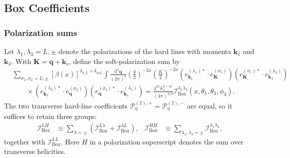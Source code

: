 \documentclass[a4paper,12pt]{article}
\def\di{{\mathrm{d}}}
\def\mb{\mathbf}
\begin{document}
\subsection{Box Coefficients}
\label{app:box-coefficients}
\subsubsection{Polarization sums}
Let $\lambda_1,\lambda_3=L,\pm$ denote the polarizations of the hard lines with momenta $\mb k_1$ and $\mb k_3$.
With $\mb K=\mb q+\mb k_s$, define the soft-polarization sum by
\begin{align}
    &\sum_{\sigma_1,\sigma_2=L,\pm}
    [\beta(x)]^{\delta_{\sigma_1L}+\delta_{\sigma_2L}}
    \int\frac{\di^3\mb q}{(2\pi)^3}
    \left(\frac q2\right)^{-2x}
    \left(\frac K2\right)^{-2x}
    (e_{\mb k_1}^{(\lambda_1)*}\!\cdot e_{\mb K}^{(\sigma_1)})
    (e_{\mb K}^{(\sigma_1)*}\!\cdot e_{\mb k_3}^{(\lambda_3)})
    \nonumber\\
    &\qquad\times
    (e_{\mb k_3}^{(\lambda_3)*}\!\cdot e_{\mb q}^{(\sigma_2)})
    (e_{\mb q}^{(\sigma_2)*}\!\cdot e_{\mb k_1}^{(\lambda_1)})
    =\frac{4^{2x}k_s^{3-4x}}{(4\pi)^{3/2}}
    \mathcal I^{\lambda_1\lambda_3}_{\mathrm{Box}}
    (x,\theta_1,\theta_3,\phi_3).
    \label{eq:box-I-definition}
\end{align}
The two transverse hard-line coefficients $\mathcal P^{(2),+}_{\eta}=\mathcal P^{(2),-}_{\eta}$ are equal, so it suffices to retain three groups:
\begin{align}
    \mathcal I^{LH}_{\mathrm{Box}}
    &\equiv\sum_{\lambda=\pm}
    \left(\mathcal I^{L\lambda}_{\mathrm{Box}}
    +\mathcal I^{\lambda L}_{\mathrm{Box}}\right),
    &\mathcal I^{HH}_{\mathrm{Box}}
    &\equiv\sum_{\lambda_1,\lambda_3=\pm}
    \mathcal I^{\lambda_1\lambda_3}_{\mathrm{Box}},
    \label{eq:box-channel-groups}
\end{align}
together with $\mathcal I^{LL}_{\mathrm{Box}}$.
Here $H$ in a polarization superscript denotes the sum over transverse helicities.
\end{document}

